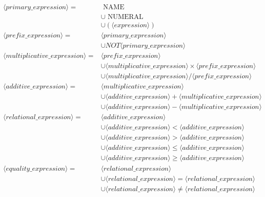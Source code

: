 \documentclass[letterpaper,11pt]{article}
\begin{document}
{{{			\begin{align*}
				\langle \textit{primary\_expression} \rangle =
					& \text{ NAME }\\
					& \cup \text{ NUMERAL }\\
					& \cup ( \langle expression \rangle )\\
				\langle \textit{prefix\_expression} \rangle =
					& \langle \textit{primary\_expression} \rangle\\
					& \cup NOT \langle \textit{primary\_expression} \rangle\\
				\langle \textit{multiplicative\_expression} \rangle =
					& \langle \textit{prefix\_expression} \rangle\\
					& \cup \langle \textit{multiplicative\_expression} \rangle \times \langle \textit{prefix\_expression} \rangle\\
					& \cup \langle \textit{multiplicative\_expression} \rangle / \langle \textit{prefix\_expression} \rangle\\
				\langle \textit{additive\_expression} \rangle =
					& \langle \textit{multiplicative\_expression} \rangle\\
					& \cup \langle \textit{additive\_expression} \rangle + \langle \textit{multiplicative\_expression} \rangle\\
					& \cup \langle \textit{additive\_expression} \rangle - \langle \textit{multiplicative\_expression} \rangle\\
				\langle \textit{relational\_expression} \rangle =
					& \langle \textit{additive\_expression} \rangle\\
					& \cup \langle \textit{additive\_expression} \rangle < \langle \textit{additive\_expression} \rangle\\
					& \cup \langle \textit{additive\_expression} \rangle > \langle \textit{additive\_expression} \rangle\\
					& \cup \langle \textit{additive\_expression} \rangle \leq \langle \textit{additive\_expression} \rangle\\
					& \cup \langle \textit{additive\_expression} \rangle \geq \langle \textit{additive\_expression} \rangle\\
				\langle \textit{equality\_expression} \rangle =
					& \langle \textit{relational\_expression} \rangle\\
					& \cup \langle \textit{relational\_expression} \rangle = \langle \textit{relational\_expression} \rangle\\
					& \cup \langle \textit{relational\_expression} \rangle \neq \langle \textit{relational\_expression} \rangle\\

\end{align*}}}}
\end{document}
